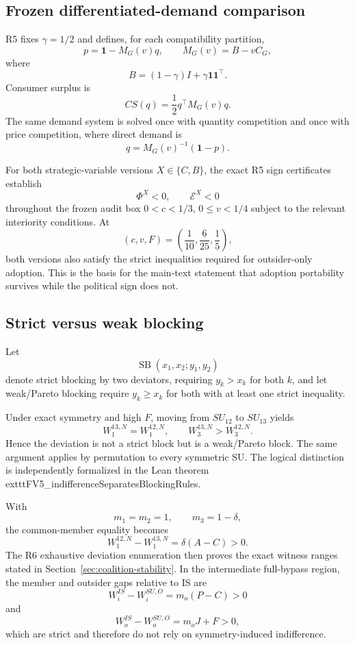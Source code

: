 \subsection{Frozen differentiated-demand comparison}

R5 fixes $\gamma=1/2$ and defines, for each compatibility partition,
\[
p=\mathbf 1-M_G(v)q,
\qquad
M_G(v)=B-vC_G,
\]
where
\[
B=(1-\gamma)I+\gamma\mathbf 1\mathbf 1^\top.
\]
Consumer surplus is
\[
CS(q)=\frac12 q^\top M_G(v)q.
\]
The same demand system is solved once with quantity competition and once with price competition, where direct demand is
\[
q=M_G(v)^{-1}(\mathbf 1-p).
\]

For both strategic-variable versions $X\in\{C,B\}$, the exact R5 sign certificates establish
\[
\Phi^X<0,
\qquad
\mathscr E^X<0
\]
throughout the frozen audit box $0<c<1/3$, $0\le v<1/4$ subject to the relevant interiority conditions. At
\[
(c,v,F)
=
\left(
\frac1{10},
\frac6{25},
\frac15
\right),
\]
both versions also satisfy the strict inequalities required for outsider-only adoption. This is the basis for the main-text statement that adoption portability survives while the political sign does not.

\subsection{Strict versus weak blocking}

Let
\[
\operatorname{SB}(x_1,x_2;y_1,y_2)
\]
denote strict blocking by two deviators, requiring $y_k>x_k$ for both $k$, and let weak/Pareto blocking require $y_k\ge x_k$ for both with at least one strict inequality.

Under exact symmetry and high $F$, moving from $SU_{12}$ to $SU_{13}$ yields
\[
W_1^{13,N}=W_1^{12,N},
\qquad
W_3^{13,N}>W_3^{12,N}.
\]
Hence the deviation is not a strict block but is a weak/Pareto block. The same argument applies by permutation to every symmetric SU. The logical distinction is independently formalized in the Lean theorem 	exttt{FV5\_indifferenceSeparatesBlockingRules}.

With
\[
m_1=m_2=1,
\qquad
m_3=1-\delta,
\]
the common-member equality becomes
\[
W_1^{12,N}-W_1^{13,N}
=
\delta(A-C)>0.
\]
The R6 exhaustive deviation enumeration then proves the exact witness ranges stated in Section~\ref{sec:coalition-stability}. In the intermediate full-bypass region, the member and outsider gaps relative to IS are
\[
W_i^{IS}-W_i^{SU,O}
=
m_o(P-C)>0
\]
and
\[
W_o^{IS}-W_o^{SU,O}
=
m_oJ+F>0,
\]
which are strict and therefore do not rely on symmetry-induced indifference.
